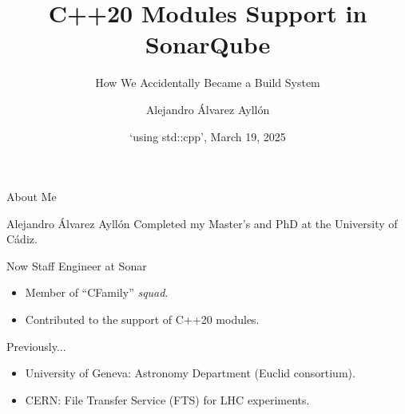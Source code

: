 \documentclass[aspectratio=169]{beamer}
\title{C++20 Modules Support in SonarQube}
\subtitle{How We Accidentally Became a Build System}
\date{`using std::cpp', March 19, 2025}
\author{Alejandro Álvarez Ayllón}
\begin{document}
\begin{frame}[standout]
  \titlepage
\end{frame}

\begin{frame}{About Me}
  \begin{block}{Alejandro Álvarez Ayllón }
    Completed my Master's and PhD at the University of Cádiz.
  \end{block}
  \begin{block}{Now Staff Engineer at Sonar}
    \begin{itemize}
      \item Member of ``CFamily'' \textit{squad}.
      \item Contributed to the support of C++20 modules.
    \end{itemize}
  \end{block}

  \begin{block}{Previously...}
    \begin{itemize}
      \item University of Geneva: Astronomy Department (Euclid consortium).
      \item CERN: File Transfer Service (FTS) for LHC experiments.
    \end{itemize}
  \end{block}
\end{frame}
\end{document}
